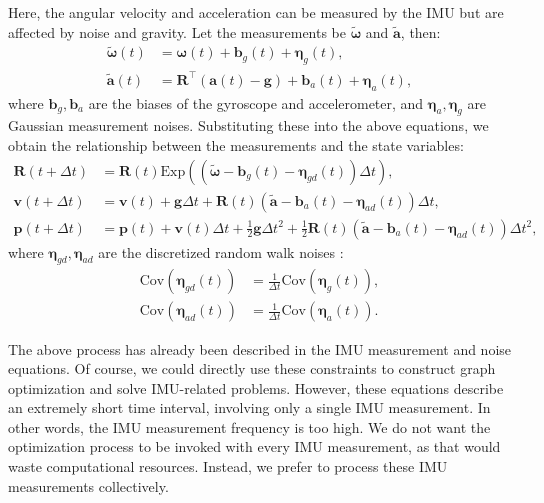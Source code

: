 Here, the angular velocity and acceleration can be measured by the IMU but are affected by noise and gravity. Let the measurements be $\tilde{\boldsymbol{\omega}}$ and $\tilde{\mathbf{a}}$, then:
\begin{subequations}\label{key}
	\begin{align}
		\tilde{\boldsymbol{\omega}}(t) &= \boldsymbol{\omega}(t) + \mathbf{b}_g (t) + \boldsymbol{\eta}_g 
		(t), \\
		\tilde{\mathbf{a}}(t) &= \mathbf{R}^\top (\mathbf{a}(t) - \mathbf{g}) + \mathbf{b}_a (t) + \boldsymbol{\eta}_a 
		(t),
	\end{align}
\end{subequations}
where $\mathbf{b}_g, \mathbf{b}_a$ are the biases of the gyroscope and accelerometer, and $\boldsymbol{\eta}_a, \boldsymbol{\eta}_g$ are Gaussian measurement noises. Substituting these into the above equations, we obtain the relationship between the measurements and the state variables:
\begin{subequations}\label{eq:kinematics-delta-t}
	\begin{align}
		\mathbf{R}(t+\Delta t) &= \mathbf{R}(t) \mathrm{Exp} \left((\tilde{\boldsymbol{\omega}} - \mathbf{b}_g(t) - 
		\boldsymbol{\eta}_{gd} (t))\Delta t \right), \\
		\mathbf{v}(t+\Delta t) &= \mathbf{v}(t) + \mathbf{g} \Delta t + \mathbf{R}(t) (\tilde{\mathbf{a}} -\mathbf{b}_a(t) - 
		\boldsymbol{\eta}_{ad}(t)) \Delta t, \\
		\mathbf{p}(t+\Delta t) &= \mathbf{p}(t) + \mathbf{v}(t) \Delta t + \frac{1}{2}\mathbf{g} \Delta t^2 + \frac{1}{2} 
		\mathbf{R}(t) (\tilde{\mathbf{a}} -\mathbf{b}_a(t) - \boldsymbol{\eta}_{ad}(t)) \Delta t^2 ,
	\end{align}
\end{subequations}
where $\boldsymbol{\eta}_{gd}, 
\boldsymbol{\eta}_{ad}$ are the discretized random walk noises \cite{Crassidis2006}:
\begin{subequations}\label{key}
	\begin{align}
		\mathrm{Cov}(\boldsymbol{\eta}_{gd}(t) ) &= \frac{1}{\Delta t} \mathrm{Cov} 
		(\boldsymbol{\eta}_g(t)), \\
		\mathrm{Cov}(\boldsymbol{\eta}_{ad}(t) ) &= \frac{1}{\Delta t} \mathrm{Cov} 
		(\boldsymbol{\eta}_a(t)).
	\end{align}
\end{subequations}

The above process has already been described in the IMU measurement and noise equations. Of course, we could directly use these constraints to construct graph optimization and solve IMU-related problems. However, these equations describe an extremely short time interval, involving only a single IMU measurement. In other words, the IMU measurement frequency is too high. We do not want the optimization process to be invoked with every IMU measurement, as that would waste computational resources. Instead, we prefer to process these IMU measurements collectively.

